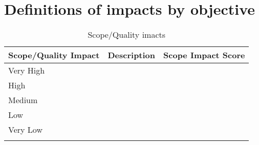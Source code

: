 \section{Definitions of impacts by objective}

\begin{longtable}[H]{l >{\raggedright\arraybackslash}p{6.3cm} p{3.5cm}}
	
	\toprule[2pt]
	
	\textbf{Scope/Quality Impact} &  \textbf{Description}  & \textbf{Scope Impact Score} \\
	
	\midrule [1.5pt]
	\endhead
	
	Very High &  & 
	\vspace{0.2cm} \\
	
	\midrule
	
	High &  & 
	\vspace{0.2cm} \\
	
	\midrule
	
	Medium &  & 
	\vspace{0.2cm} \\

	\midrule

	Low &  & 
	\vspace{0.2cm} \\

	\midrule

	Very Low &  & 
	\vspace{0.2cm} \\
		
	\bottomrule[2pt]
	
	\caption{Scope/Quality imacts}

\end{longtable}




